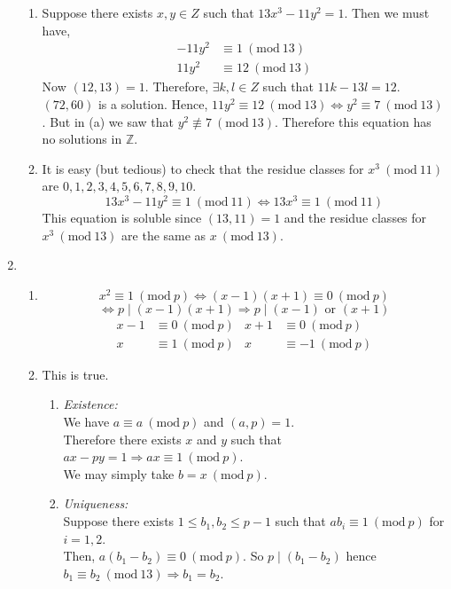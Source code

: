 \documentclass[11pt]{article}
\newcommand{\Mod}[1]{\ (\mathrm{mod}\ #1)}
\begin{document}
\begin{enumerate}
{\begin{enumerate}
$(-6, -1)$ is a solution. $2x^2 \equiv 1 \Mod{13} \iff x^2 \equiv 7 \Mod{13}$. But in (a) we saw that $x^2 \not\equiv 7 \Mod{13}$. Therefore the equation is not soluble. 
\item Suppose there exists $x,y \in Z$ such that $13x^3-11y^2 =1$. Then we must have,
\begin{equation} 
\begin{split}
-11y^2 & \equiv 1 \Mod{13} \\
11y^2 & \equiv 12 \Mod{13}
\end{split}
\end{equation}
Now $(12,13) =1$. Therefore, $\exists k,l \in Z$ such that $11k - 13l  =12$. 
\\$(72,60)$ is a solution. Hence, $11y^2  \equiv 12 \Mod{13} \iff y^2 \equiv 7 \Mod{13}$. But in (a) we saw that $y^2 \not\equiv 7 \Mod{13}$. Therefore this equation has no solutions in $\mathbb{Z}$.
\item It is easy (but tedious) to check that the residue classes for $x^3 \Mod{11}$ are $0,1,2,3,4,5,6,7,8,9,10$. 
$$13x^3-11y^2\equiv 1 \Mod{11} \iff 13x^3 \equiv 1 \Mod{11}$$
This equation is soluble since $(13,11)= 1$ and the residue classes for $x^3 \Mod{13}$ are the same as $x \Mod{13}$. 
\end{enumerate}}
\item{\begin{enumerate}
\item $$x^2 \equiv 1 \Mod{p} \Leftrightarrow (x-1)(x+1) \equiv 0 \Mod{p}$$
$$\Leftrightarrow p \mid (x-1)(x+1) \Rightarrow p \mid (x-1) \mbox{ or } (x+1)$$
\begin{align*}
x-1 &\equiv 0 \Mod{p}           &  x+1 &\equiv 0 \Mod{p} \\
x &\equiv 1 \Mod{p}    &  x &\equiv -1 \Mod{p}   
\end{align*}
\item This is true.
{\begin{enumerate}
\item \textit{Existence:} \\We have $a \equiv a \Mod{p}$ and $(a,p) =1$. \\
Therefore there exists $x$ and $y$ such that $ax -py= 1 \Rightarrow ax \equiv 1 \Mod{p}$. \\ We may simply take $b = x \Mod{p}$.
\item \textit{Uniqueness:} \\ Suppose there exists $1\leq b_1, b_2 \leq p-1$ such that $ab_i \equiv 1 \Mod{p}$ for $i = 1, 2$.
\\Then, $a(b_1-b_2) \equiv 0 \Mod{p}$. So $p\mid (b_1 -b_2)$ hence $b_1\equiv b_2 \Mod{13} \Rightarrow b_1 =b_2$. 

\end{enumerate}}
\end{enumerate}}
\end{enumerate}
\end{document}
